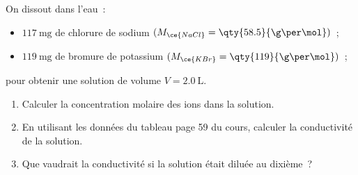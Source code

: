 On dissout dans l'eau~:
\begin{itemize}
    \item $\qty{117}{\mg}$ de chlorure de sodium
          $(M_{\ce{NaCl}}=\qty{58.5}{\g\per\mol})$~;
    \item $\qty{119}{\mg}$ de bromure de potassium
          $(M_{\ce{KBr}}=\qty{119}{\g\per\mol})$~;
\end{itemize}
pour obtenir une solution de volume $V=\qty{2.0}{\L}$.
\begin{enumerate}
    \item Calculer la concentration molaire des ions dans la solution.
    \item En utilisant les données du tableau page 59 du cours, calculer la
          conductivité de la solution.
    \item Que vaudrait la conductivité si la solution était diluée au dixième~?
\end{enumerate}


